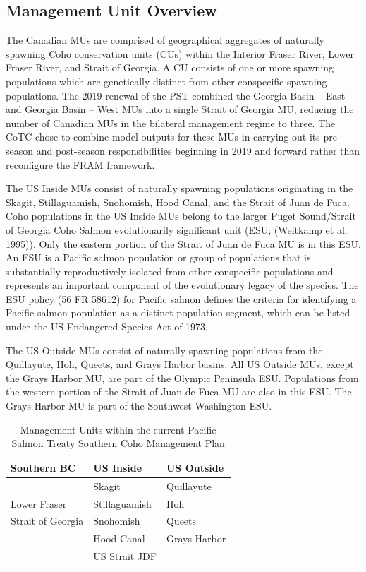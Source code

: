 \documentclass[
  letterpaper,
  DIV=11,
  numbers=noendperiod]{scrartcl}
\begin{document}
\subsection{Management Unit Overview}\label{management-unit-overview}

The Canadian MUs are comprised of geographical aggregates of naturally
spawning Coho conservation units (CUs) within the Interior Fraser River,
Lower Fraser River, and Strait of Georgia. A CU consists of one or more
spawning populations which are genetically distinct from other
conspecific spawning populations. The 2019 renewal of the PST combined
the Georgia Basin -- East and Georgia Basin -- West MUs into a single
Strait of Georgia MU, reducing the number of Canadian MUs in the
bilateral management regime to three. The CoTC chose to combine model
outputs for these MUs in carrying out its pre-season and post-season
responsibilities beginning in 2019 and forward rather than reconfigure
the FRAM framework.

The US Inside MUs consist of naturally spawning populations originating
in the Skagit, Stillaguamish, Snohomish, Hood Canal, and the Strait of
Juan de Fuca. Coho populations in the US Inside MUs belong to the larger
Puget Sound/Strait of Georgia Coho Salmon evolutionarily significant
unit (ESU; (Weitkamp et al. 1995)). Only the eastern portion of the
Strait of Juan de Fuca MU is in this ESU. An ESU is a Pacific salmon
population or group of populations that is substantially reproductively
isolated from other conspecific populations and represents an important
component of the evolutionary legacy of the species. The ESU policy (56
FR 58612) for Pacific salmon defines the criteria for identifying a
Pacific salmon population as a distinct population segment, which can be
listed under the US Endangered Species Act of 1973.

The US Outside MUs consist of naturally-spawning populations from the
Quillayute, Hoh, Queets, and Grays Harbor basins. All US Outside MUs,
except the Grays Harbor MU, are part of the Olympic Peninsula ESU.
Populations from the western portion of the Strait of Juan de Fuca MU
are also in this ESU. The Grays Harbor MU is part of the Southwest
Washington ESU.

\begin{table}
\caption*{
{\large Management Units within the current Pacific Salmon Treaty Southern Coho Management Plan}
} 
\fontsize{12.0pt}{14.4pt}\selectfont
\begin{tabular*}{300pt}{@{\extracolsep{\fill}}lll}
\toprule
{\bfseries Southern BC} & {\bfseries US Inside} & {\bfseries US Outside} \\ 
\midrule\addlinespace[2.5pt]
{Interior Fraser} & {Skagit} & {Quillayute} \\ 
{Lower Fraser} & {Stillaguamish} & {Hoh} \\ 
{Strait of Georgia} & {Snohomish} & {Queets} \\ 
{} & {Hood Canal} & {Grays Harbor} \\ 
{} & {US Strait JDF} & {} \\ 
\bottomrule
\end{tabular*}
\end{table}
\end{document}
